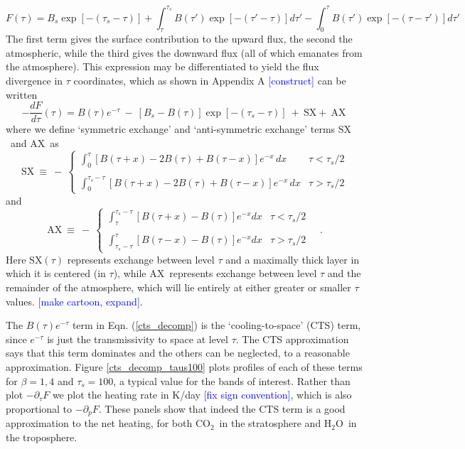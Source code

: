 \documentclass[10pt]{article}
\newcommand{\comment}[1]{\textcolor{blue}{[{#1}]}}
\newcommand{\beqn}{\begin{equation}}
\newcommand{\eeqn}{\end{equation}}
\newcommand{\eqnref}[1]{(\ref{#1})}
\newcommand{\ddtau}[1]{\ensuremath{\frac{d #1}{d\tau}}}
\newcommand{\ppp}{\ensuremath{\partial_p}}
\newcommand{\pptau}{\ensuremath{\partial_\tau}}
\newcommand{\cotwo}{\ensuremath{\mathrm{CO_2}}}
\newcommand{\htwo}{\ensuremath{\mathrm{H_2O}}}
\newcommand{\taus}{\ensuremath{\tau_s}}
\newcommand{\Bs}{\ensuremath{B_s}}
\newcommand{\SX}{\ensuremath{\mathrm{SX}}}
\newcommand{\AX}{\ensuremath{\mathrm{AX}}}
\begin{document}
\beqn
	F(\tau) = \Bs\exp[-(\taus-\tau)] + \int_\tau^{\taus} B(\tau')\exp[-(\tau'-\tau)] d\tau' - \int_0^\tau B(\tau')\exp[-(\tau-\tau')]d\tau' 
	\label{F_tau}
\eeqn 
The first term gives the surface contribution to the upward flux, the second the atmospheric, while the third gives the downward flux (all of which emanates from the atmosphere). This expression may be differentiated to yield the flux divergence in $\tau$ coordinates, which as shown in Appendix A \comment{construct} can be written
	\beqn
		-\ddtau{F}(\tau) = B(\tau)e^{-\tau} \ - \  [\Bs - B(\tau)]\exp[-(\taus - \tau)] \ + \ \SX + \ \AX \ 
		\label{cts_decomp}
	\eeqn
where we define `symmetric exchange' and `anti-symmetric exchange' terms \SX\ and \AX\ as 
	\beqn 
		\SX \ \equiv \   -\ \left\{ \begin{array}{cr} \int_0^\tau [B(\tau + x) - 2B(\tau) + B(\tau-x)]e^{-x}\,dx   & \tau < \taus/2 \\
																															 &  \\	
												\int_{0}^{\taus-\tau} [B(\tau + x) - 2B(\tau) + B(\tau-x)]e^{-x}\,dx   & \tau > \taus/2 
							\end{array}   \right.  
	\eeqn
and
	\beqn
		\AX  \ \equiv \   -\ \left\{ \begin{array}{cr} \int_{\tau}^{\taus-\tau}[B(\tau + x)-B(\tau)]e^{-x}	dx 	& \tau < \taus/2 \\
																																					& \\
													 \int_{\taus - \tau}^{\tau}[B(\tau - x)-B(\tau)]e^{-x} 	dx 	& \tau > \taus/2 
							\end{array}  \right. \quad .
	\eeqn
Here $\SX(\tau)$ represents exchange between level $\tau$ and a maximally thick  layer in which it is centered (in $\tau$), while \AX\ represents exchange between level $\tau$ and the remainder of the atmosphere, which will lie entirely at either greater or smaller $\tau$ values. \comment{make cartoon, expand}. 

The $B(\tau)e^{-\tau}$ term in Eqn. \eqnref{cts_decomp} is the `cooling-to-space' (CTS) term, since $e^{-\tau}$ is just the transmissivity to space at level $\tau$. The CTS approximation says that this term dominates and the others can be neglected, to a reasonable approximation. Figure \ref{cts_decomp_taus100} plots profiles of each of these terms for $\beta = 1,4$ and $\taus=100$, a typical value for the bands of interest. Rather than plot $-\pptau F$ we plot the heating rate in K/day \comment{fix sign convention}, which is also proportional to $-\ppp F$. These panels show that indeed the CTS term is a good approximation to the net heating, for both \cotwo\ in the stratosphere and \htwo\ in the troposphere.
\end{document}
